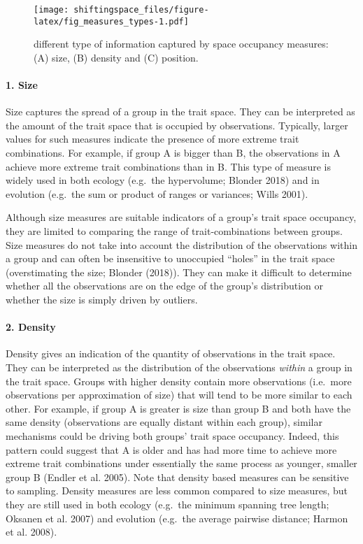 \documentclass[]{article}
\let\oldparagraph\paragraph
\renewcommand{\paragraph}[1]{\oldparagraph{#1}\mbox{}}
\begin{document}
\begin{figure}
\centering
\texttt{[image: shiftingspace\_files/figure-latex/fig\_measures\_types-1.pdf]}
\caption{different type of information captured by space occupancy
measures: (A) size, (B) density and (C) position.}
\end{figure}

\paragraph{1. Size}\label{size}

Size captures the spread of a group in the trait space. They can be
interpreted as the amount of the trait space that is occupied by
observations. Typically, larger values for such measures indicate the
presence of more extreme trait combinations. For example, if group A is
bigger than B, the observations in A achieve more extreme trait
combinations than in B. This type of measure is widely used in both
ecology (e.g.~the hypervolume; Blonder 2018) and in evolution (e.g.~the
sum or product of ranges or variances; Wills 2001).

Although size measures are suitable indicators of a group's trait space
occupancy, they are limited to comparing the range of trait-combinations
between groups. Size measures do not take into account the distribution
of the observations within a group and can often be insensitive to
unoccupied ``holes'' in the trait space (overstimating the size; Blonder
(2018)). They can make it difficult to determine whether all the
observations are on the edge of the group's distribution or whether the
size is simply driven by outliers.

\paragraph{2. Density}\label{density}

Density gives an indication of the quantity of observations in the trait
space. They can be interpreted as the distribution of the observations
\emph{within} a group in the trait space. Groups with higher density
contain more observations (i.e.~more observations per approximation of
size) that will tend to be more similar to each other. For example, if
group A is greater is size than group B and both have the same density
(observations are equally distant within each group), similar mechanisms
could be driving both groups' trait space occupancy. Indeed, this
pattern could suggest that A is older and has had more time to achieve
more extreme trait combinations under essentially the same process as
younger, smaller group B (Endler et al. 2005). Note that density based
measures can be sensitive to sampling. Density measures are less common
compared to size measures, but they are still used in both ecology
(e.g.~the minimum spanning tree length; Oksanen et al. 2007) and
evolution (e.g.~the average pairwise distance; Harmon et al. 2008).
\end{document}
